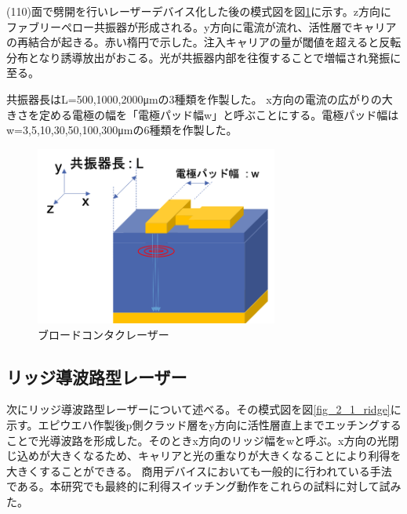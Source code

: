 (110)面で劈開を行いレーザーデバイス化した後の模式図を図\ref{fig:sample_broadcontact}に示す。z方向にファブリーペロー共振器が形成される。y方向に電流が流れ、活性層でキャリアの再結合が起きる。赤い楕円で示した。注入キャリアの量が閾値を超えると反転分布となり誘導放出がおこる。光が共振器内部を往復することで増幅され発振に至る。

共振器長はL=500,1000,2000\si{\micro\metre}の3種類を作製した。
x方向の電流の広がりの大きさを定める電極の幅を「電極パッド幅w」と呼ぶことにする。電極パッド幅はw=3,5,10,30,50,100,300\si{\micro\metre}の6種類を作製した。

\begin{figure}[h]
	\centering
	\includegraphics[width=8cm]{figure/fig_2_1_broadcontact.png}
	\caption{ブロードコンタクレーザー}
	\label{fig:sample_broadcontact}
\end{figure}

\subsection{リッジ導波路型レーザー}%
次にリッジ導波路型レーザーについて述べる。その模式図を図\ref{fig_2_1_ridge}に示す。エピウエハ作製後p側クラッド層をy方向に活性層直上までエッチングすることで光導波路を形成した。そのときx方向のリッジ幅をwと呼ぶ。x方向の光閉じ込めが大きくなるため、キャリアと光の重なりが大きくなることにより利得を大きくすることができる。%
商用デバイスにおいても一般的に行われている手法である。本研究でも最終的に利得スイッチング動作をこれらの試料に対して試みた。

